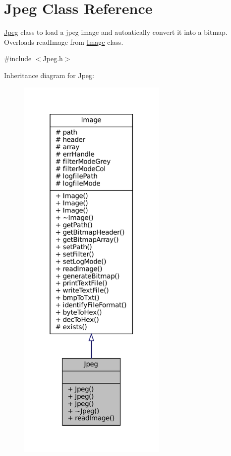 \hypertarget{classJpeg}{}\section{Jpeg Class Reference}
\label{classJpeg}


\mbox{\hyperlink{classJpeg}{Jpeg}} class to load a jpeg image and autoatically convert it into a bitmap. Overloads read\+Image from \mbox{\hyperlink{classImage}{Image}} class.  




{\ttfamily \#include $<$Jpeg.\+h$>$}



Inheritance diagram for Jpeg\+:\nopagebreak
\begin{figure}[H]
\begin{center}
\leavevmode
\includegraphics[height=550pt]{classJpeg__inherit__graph}
\end{center}
\end{figure}


